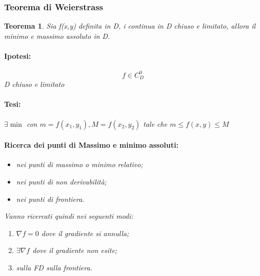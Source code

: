 \documentclass{book}
\newtheorem{teorema}{Teorema}
\begin{document}
\subsubsection{Teorema di Weierstrass}
\begin{teorema}
	Sia f(x,y) definita in D, i continua in D chiuso e limitato, allora il
	minimo e massimo assoluto in D.
	\begin{multicols}{2}
		\paragraph{Ipotesi:}
		\begin{equation*}
			f\in C^0_D
		\end{equation*}
		D chiuso e limitato
		\paragraph{Tesi:}
		$\exists\min$ con $m=f(x_1,y_1), M=f(x_2,y_2)$ tale che $m\leq
		f(x,y)\leq M$
	\end{multicols}
	\paragraph{Ricerca dei punti di Massimo e minimo assoluti:}
	\begin{itemize}
		\item nei punti di massimo o minimo relativo;
		\item nei punti di non derivabilità;
		\item nei punti di frontiera.
	\end{itemize}
	Vanno ricercati quindi nei seguenti modi:
	\begin{enumerate}
		\item $\nabla f=0$ dove il gradiente si annulla;
		\item $\exists \nabla f$ dove il gradiente non esite;
		\item sulla FD sulla frontiera.
	\end{enumerate}
\end{teorema}
\end{document}
